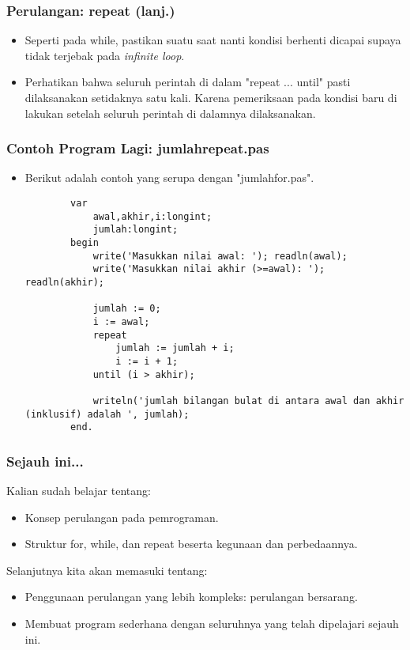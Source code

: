 \documentclass{beamer}
\begin{document}
\begin{frame}
\frametitle{Perulangan: repeat (lanj.)}
\begin{itemize}
	\item Seperti pada while, pastikan suatu saat nanti kondisi berhenti dicapai supaya tidak terjebak pada \textit{infinite loop}.
	\item Perhatikan bahwa seluruh perintah di dalam "repeat ... until" \alert{pasti} dilaksanakan setidaknya satu kali. Karena pemeriksaan pada kondisi baru di lakukan setelah seluruh perintah di dalamnya dilaksanakan. 
\end{itemize}
\end{frame}

\begin{frame}[fragile]
\frametitle{Contoh Program Lagi: jumlahrepeat.pas}
\begin{itemize}
	\item Berikut adalah contoh yang serupa dengan "jumlahfor.pas".
	\begin{lstlisting}
		var
		    awal,akhir,i:longint;
		    jumlah:longint;
		begin
		    write('Masukkan nilai awal: '); readln(awal);
		    write('Masukkan nilai akhir (>=awal): '); readln(akhir);
		
		    jumlah := 0;
		    i := awal;
		    repeat
		        jumlah := jumlah + i;
		        i := i + 1;
		    until (i > akhir);
		
		    writeln('jumlah bilangan bulat di antara awal dan akhir (inklusif) adalah ', jumlah);
		end.
	\end{lstlisting}
\end{itemize}
\end{frame}

\begin{frame}
\frametitle{Sejauh ini...}
Kalian sudah belajar tentang:
\begin{itemize}
	\item Konsep perulangan pada pemrograman.
	\item Struktur for, while, dan repeat beserta kegunaan dan perbedaannya.
\end{itemize}
Selanjutnya kita akan memasuki tentang:
\begin{itemize}
	\item Penggunaan perulangan yang lebih kompleks: perulangan bersarang.
	\item Membuat program sederhana dengan seluruhnya yang telah dipelajari sejauh ini.
\end{itemize}
\end{frame}
\end{document}
